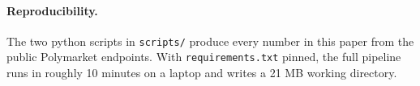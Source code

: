 \documentclass{article}
\begin{document}
\paragraph{Reproducibility.} The two python scripts in
\texttt{scripts/} produce every number in this paper from the public
Polymarket endpoints. With \texttt{requirements.txt} pinned, the
full pipeline runs in roughly 10 minutes on a laptop and writes a
21 MB working directory.

{
\small


}
\end{document}
